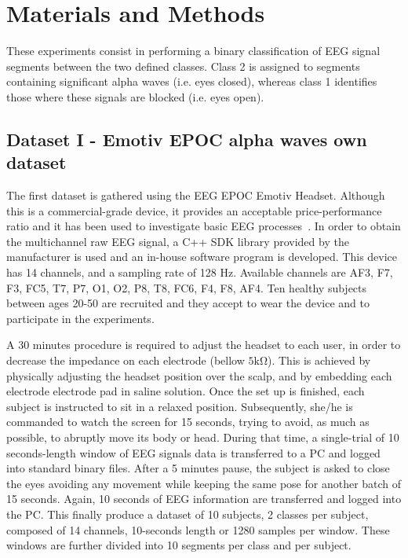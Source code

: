 \section{Materials and Methods}

These experiments consist in performing a binary classification of EEG signal segments between the two defined classes.  Class 2 is assigned to segments containing significant alpha waves (i.e. eyes closed), whereas class 1 identifies those where these signals are blocked (i.e. eyes open).


\subsection{Dataset I - Emotiv EPOC alpha waves own dataset}
\label{dataset1}
The first dataset is gathered using the EEG EPOC Emotiv Headset.  Although this is a commercial-grade device, it provides an acceptable price-performance ratio and it has been used to investigate basic EEG processes~\cite{Debener2012,DeVos2014}. In order to obtain the multichannel raw EEG signal, a C++ SDK library provided by the manufacturer is used and an in-house software program is developed. This device has 14 channels, and a sampling rate of 128 \si{Hz}\cite{c11}. Available channels are AF3, F7, F3, FC5, T7, P7, O1, O2, P8, T8,  FC6, F4, F8, AF4.  Ten healthy subjects between ages 20-50 are recruited and they accept to wear the device and to participate in the experiments.  

A 30 minutes procedure is required to adjust the headset to each user, in order to decrease the impedance on each electrode (bellow $5 \si{\kilo\ohm}$).  
This is achieved by physically adjusting the headset position over the scalp, and by embedding each electrode electrode pad in saline solution.
Once the set up is finished, each subject is instructed to sit in a relaxed position. Subsequently, she/he is commanded to watch the screen for 15 seconds, trying to avoid, as much as possible, to abruptly move its body or head.  During that time, a single-trial of 10 seconds-length window of EEG signals data is transferred to a PC and logged into standard binary files. After a 5 minutes pause, the subject is asked to close the eyes avoiding any movement while keeping the same pose for another batch of 15 seconds.  Again, 10 seconds of EEG information are transferred and logged into the PC. This finally produce a dataset of 10 subjects,  2 classes per subject, composed of 14 channels, 10-seconds length or 1280 samples per window.  These windows are further divided into 10 segments per class and per subject.

